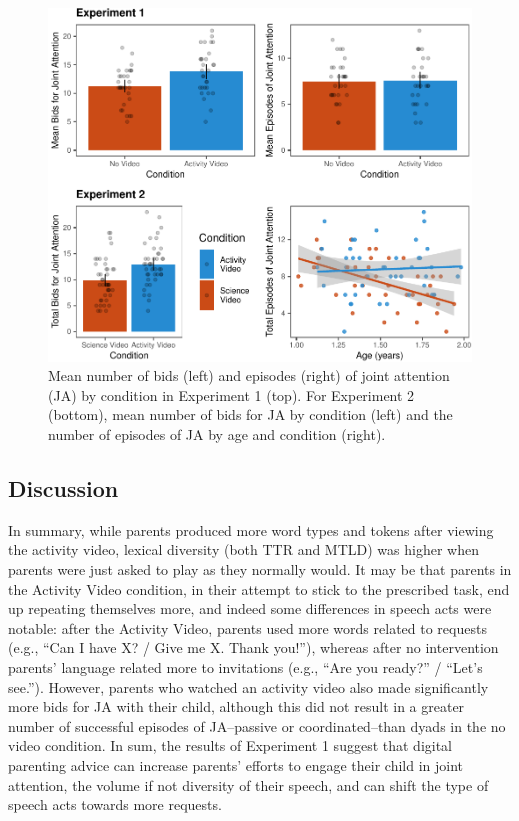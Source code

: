 \documentclass[man,floatsintext]{apa6}
\begin{document}
\begin{figure}[H]

{\centering \includegraphics{figs/fig-JA-1} 

}

\caption{\label{fig:JA} Mean number of bids (left) and episodes (right) of joint attention (JA) by condition in Experiment 1 (top). For Experiment 2 (bottom), mean number of bids for JA by condition (left) and the number of episodes of JA by age and condition (right).}\label{fig:fig-JA}
\end{figure}

\hypertarget{discussion}{%
\subsection{Discussion}\label{discussion}}

In summary, while parents produced more word types and tokens after viewing the activity video, lexical diversity (both TTR and MTLD) was higher when parents were just asked to play as they normally would.
It may be that parents in the Activity Video condition, in their attempt to stick to the prescribed task, end up repeating themselves more, and indeed some differences in speech acts were notable:
after the Activity Video, parents used more words related to requests (e.g., \enquote{Can I have X? / Give me X. Thank you!}), whereas after no intervention parents' language related more to invitations (e.g., \enquote{Are you ready?} / \enquote{Let's see.}).
However, parents who watched an activity video also made significantly more bids for JA with their child, although this did not result in a greater number of successful episodes of JA--passive or coordinated--than dyads in the no video condition.
In sum, the results of Experiment 1 suggest that digital parenting advice can increase parents' efforts to engage their child in joint attention, the volume if not diversity of their speech, and can shift the type of speech acts towards more requests.
\end{document}
